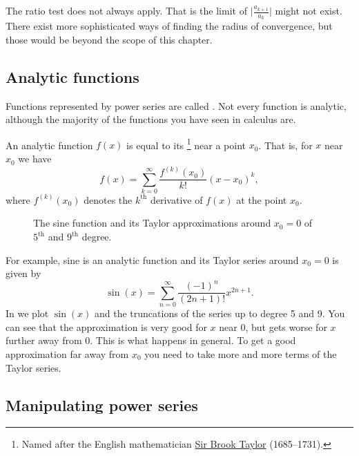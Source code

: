 \documentclass[12pt]{book}
\begin{document}
The ratio test does not always apply.  That is
the limit
of $\bigl \lvert \frac{a_{k+1}}{a_k} \bigr \rvert$ might not exist.
There exist more sophisticated ways of finding the radius of convergence,
but those would be beyond the scope of this chapter.


\subsection{Analytic functions}

Functions represented by power series are called
\emph{}.  Not every function is analytic,
although the majority of the functions you have seen in calculus are.

An analytic function $f(x)$ is equal to its \emph{}%
\footnote{Named after the English mathematician
\href{http://en.wikipedia.org/wiki/Brook_Taylor}{Sir Brook Taylor}
(1685--1731).}
near a point $x_0$.
That is, for $x$ near $x_0$ we have
\begin{equation} \label{ps:tayloreq}
f(x) = \sum_{k=0}^\infty \frac{f^{(k)}(x_0)}{k!} {(x-x_0)}^k ,
\end{equation}
where $f^{(k)}(x_0)$ denotes the $k^{\text{th}}$ derivative of $f(x)$
at the point $x_0$.

\begin{figure}[h!t]
\capstart
\begin{center}
\caption{The sine function and its Taylor approximations
around $x_0=0$
of $5^{\text{th}}$ and $9^{\text{th}}$ degree.\label{ps:sin}}
\end{center}
\end{figure}
For example, sine is an analytic function and its Taylor series
around $x_0 = 0$
is given by
\begin{equation*}
\sin(x) = \sum_{n=0}^\infty \frac{{(-1)}^n}{(2n+1)!}
 x^{2n+1} .
\end{equation*}
In  we plot $\sin(x)$ and the truncations of the
series up to degree 5 and 9.  You can see that the approximation is very
good for $x$ near 0, but gets worse for $x$ further away from 0.  This is 
what happens in general.
To get a good approximation far away from $x_0$ you
need to take more and more terms of the Taylor series.

\subsection{Manipulating power series}
\end{document}

